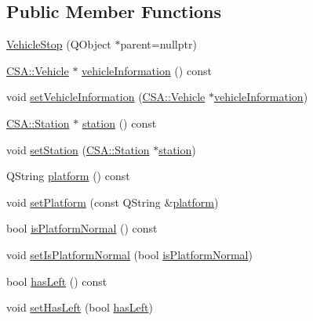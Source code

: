 \subsection*{Public Member Functions}
\begin{DoxyCompactItemize}
\item 
\mbox{\hyperlink{classCSA_1_1VehicleStop_a63f372612a68275d78307b9293339525}{Vehicle\+Stop}} (Q\+Object $\ast$parent=nullptr)
\item 
\mbox{\hyperlink{classCSA_1_1Vehicle}{C\+S\+A\+::\+Vehicle}} $\ast$ \mbox{\hyperlink{classCSA_1_1VehicleStop_ace091d4626e1d5a113f84e9c2b0d07f5}{vehicle\+Information}} () const
\item 
void \mbox{\hyperlink{classCSA_1_1VehicleStop_ac5985077bb7570364bac137c4888c859}{set\+Vehicle\+Information}} (\mbox{\hyperlink{classCSA_1_1Vehicle}{C\+S\+A\+::\+Vehicle}} $\ast$\mbox{\hyperlink{classCSA_1_1VehicleStop_ace091d4626e1d5a113f84e9c2b0d07f5}{vehicle\+Information}})
\item 
\mbox{\hyperlink{classCSA_1_1Station}{C\+S\+A\+::\+Station}} $\ast$ \mbox{\hyperlink{classCSA_1_1VehicleStop_ae1c6e68ec554e65041a2f577433f314d}{station}} () const
\item 
void \mbox{\hyperlink{classCSA_1_1VehicleStop_ae4a990a9e2c462461cf6cdccb129466c}{set\+Station}} (\mbox{\hyperlink{classCSA_1_1Station}{C\+S\+A\+::\+Station}} $\ast$\mbox{\hyperlink{classCSA_1_1VehicleStop_ae1c6e68ec554e65041a2f577433f314d}{station}})
\item 
Q\+String \mbox{\hyperlink{classCSA_1_1VehicleStop_a41eaa371b831197436e9250e5699819a}{platform}} () const
\item 
void \mbox{\hyperlink{classCSA_1_1VehicleStop_a8ef5b90a559539e2a7b46ceed701e06d}{set\+Platform}} (const Q\+String \&\mbox{\hyperlink{classCSA_1_1VehicleStop_a41eaa371b831197436e9250e5699819a}{platform}})
\item 
bool \mbox{\hyperlink{classCSA_1_1VehicleStop_a77b08114a893c3dba935f07496cdb49a}{is\+Platform\+Normal}} () const
\item 
void \mbox{\hyperlink{classCSA_1_1VehicleStop_a55d1d0894b469a1c0018b7a0429a88c0}{set\+Is\+Platform\+Normal}} (bool \mbox{\hyperlink{classCSA_1_1VehicleStop_a77b08114a893c3dba935f07496cdb49a}{is\+Platform\+Normal}})
\item 
bool \mbox{\hyperlink{classCSA_1_1VehicleStop_aeaaf6234293faa5263981162bcc375a7}{has\+Left}} () const
\item 
void \mbox{\hyperlink{classCSA_1_1VehicleStop_ad85c1ed32b7fca5587ec5c64061781a6}{set\+Has\+Left}} (bool \mbox{\hyperlink{classCSA_1_1VehicleStop_aeaaf6234293faa5263981162bcc375a7}{has\+Left}})

\end{DoxyCompactItemize}

